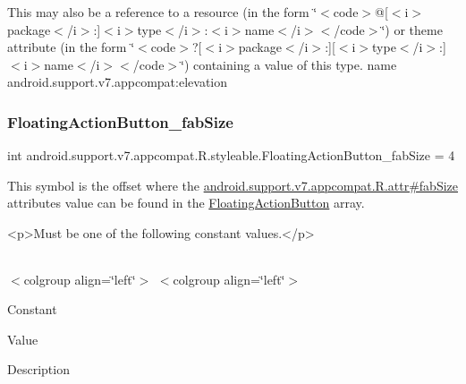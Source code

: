 This may also be a reference to a resource (in the form \char`\"{}$<$code$>$@\mbox{[}$<$i$>$package$<$/i$>$\+:\mbox{]}$<$i$>$type$<$/i$>$\+:$<$i$>$name$<$/i$>$$<$/code$>$\char`\"{}) or theme attribute (in the form \char`\"{}$<$code$>$?\mbox{[}$<$i$>$package$<$/i$>$\+:\mbox{]}\mbox{[}$<$i$>$type$<$/i$>$\+:\mbox{]}$<$i$>$name$<$/i$>$$<$/code$>$\char`\"{}) containing a value of this type.  name android.\+support.\+v7.\+appcompat\+:elevation \mbox{\label{classandroid_1_1support_1_1v7_1_1appcompat_1_1R_1_1styleable_abfe4b5cb807f029e53b6d0b103915d9d}} 
\subsubsection{\texorpdfstring{Floating\+Action\+Button\+\_\+fab\+Size}{FloatingActionButton\_fabSize}}
{\footnotesize\ttfamily int android.\+support.\+v7.\+appcompat.\+R.\+styleable.\+Floating\+Action\+Button\+\_\+fab\+Size = 4\hspace{0.3cm}{\ttfamily [static]}}

This symbol is the offset where the \hyperlink{classandroid_1_1support_1_1v7_1_1appcompat_1_1R_1_1attr_ac6e7b6a3e83161f81bc98d8589e3730f}{android.\+support.\+v7.\+appcompat.\+R.\+attr\#fab\+Size} attribute\textquotesingle{}s value can be found in the \hyperlink{classandroid_1_1support_1_1v7_1_1appcompat_1_1R_1_1styleable_a9bfca89352160169125a89277e9fb2a1}{Floating\+Action\+Button} array.

\begin{DoxyVerb}      <p>Must be one of the following constant values.</p>
\end{DoxyVerb}
 \tabulinesep=1mm
\begin{longtabu} spread 0pt [c]{*{0}{|X[-1]}|}
\hline
\end{longtabu}
$<$colgroup align=\char`\"{}left\char`\"{}$>$ $<$colgroup align=\char`\"{}left\char`\"{}$>$ 

Constant

Value

Description 

